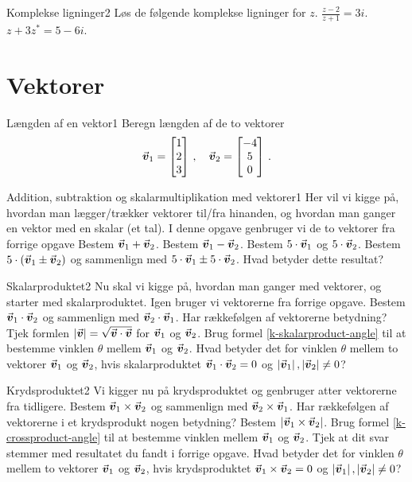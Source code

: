 \begin{opgave}{Komplekse ligninger}{2}
Løs de følgende komplekse ligninger for $z$.
\opg $\frac{z-2}{z+1} = 3i$.
\opg $z+3z^* = 5-6i$.
\end{opgave}
\section*{Vektorer}
\begin{opgave}{Længden af en vektor}{1} 
Beregn længden af de to vektorer
\begin{align*}
{\vec{\boldsymbol{v}}}_1 = \begin{bmatrix} 1 \\ 2 \\ 3 \end{bmatrix} \, , \quad {\vec{\boldsymbol{v}}}_2 = \begin{bmatrix} -4 \\ 5 \\ 0  \end{bmatrix} \, .
\end{align*}
\end{opgave}
\begin{opgave}{Addition, subtraktion og skalarmultiplikation med vektorer}{1}
Her vil vi kigge på, hvordan man lægger/trækker vektorer til/fra hinanden, og hvordan man ganger en vektor med en skalar (et tal). I denne opgave genbruger vi de to vektorer fra forrige opgave 
\opg Bestem ${\vec{\boldsymbol{v}}}_1 + {\vec{\boldsymbol{v}}}_2$.
\opg Bestem ${\vec{\boldsymbol{v}}}_1 - {\vec{\boldsymbol{v}}}_2$.
\opg Bestem $5 \cdot {\vec{\boldsymbol{v}}}_1$ og $5 \cdot {\vec{\boldsymbol{v}}}_2$.
\opg Bestem $5 \cdot \left( {\vec{\boldsymbol{v}}}_1 \pm {\vec{\boldsymbol{v}}}_2 \right)$ og sammenlign med $5 \cdot {\vec{\boldsymbol{v}}}_1 \pm 5 \cdot {\vec{\boldsymbol{v}}}_2$. Hvad betyder dette resultat?
\end{opgave}
\begin{opgave}{Skalarproduktet}{2}
Nu skal vi kigge på, hvordan man ganger med vektorer, og starter med skalarproduktet. Igen bruger vi vektorerne fra forrige opgave.
\opg Bestem ${\vec{\boldsymbol{v}}}_1 \cdot {\vec{\boldsymbol{v}}}_2$ og sammenlign med ${\vec{\boldsymbol{v}}}_2 \cdot {\vec{\boldsymbol{v}}}_1$. Har rækkefølgen af vektorerne betydning?
\opg Tjek formlen $\left| {\vec{\boldsymbol{v}}} \right| = \sqrt{{\vec{\boldsymbol{v}}} \cdot {\vec{\boldsymbol{v}}}}$ for ${\vec{\boldsymbol{v}}}_1$ og ${\vec{\boldsymbol{v}}}_2$.
\opg Brug formel \eqref{k-skalarproduct-angle} til at bestemme vinklen $\theta$ mellem ${\vec{\boldsymbol{v}}}_1$ og ${\vec{\boldsymbol{v}}}_2$.
\opg Hvad betyder det for vinklen $\theta$ mellem to vektorer ${\vec{\boldsymbol{v}}}_1$ og ${\vec{\boldsymbol{v}}}_2$, hvis skalarproduktet ${\vec{\boldsymbol{v}}}_1 \cdot {\vec{\boldsymbol{v}}}_2 = 0$ og $\left| {\vec{\boldsymbol{v}}}_1 \right|,\left| {\vec{\boldsymbol{v}}}_2 \right| \neq 0$?\\  
\end{opgave}
\begin{opgave}{Krydsproduktet}{2}
Vi kigger nu på krydsproduktet og genbruger atter vektorerne fra tidligere.
\opg Bestem ${\vec{\boldsymbol{v}}}_1 \times {\vec{\boldsymbol{v}}}_2$ og sammenlign med ${\vec{\boldsymbol{v}}}_2 \times {\vec{\boldsymbol{v}}}_1$. Har rækkefølgen af vektorerne i et krydsprodukt nogen betydning? 
\opg Bestem $\left| {\vec{\boldsymbol{v}}}_1 \times {\vec{\boldsymbol{v}}}_2 \right|$.
\opg Brug formel \eqref{k-crossproduct-angle} til at bestemme vinklen mellem ${\vec{\boldsymbol{v}}}_1$ og ${\vec{\boldsymbol{v}}}_2$. Tjek at dit svar stemmer med resultatet du fandt i forrige opgave.
\opg Hvad betyder det for vinklen $\theta$ mellem to vektorer ${\vec{\boldsymbol{v}}}_1$ og ${\vec{\boldsymbol{v}}}_2$, hvis krydsproduktet ${\vec{\boldsymbol{v}}}_1 \times {\vec{\boldsymbol{v}}}_2 = 0$ og $\left| {\vec{\boldsymbol{v}}}_1 \right|,\left| {\vec{\boldsymbol{v}}}_2 \right| \neq 0$? 
\end{opgave}
